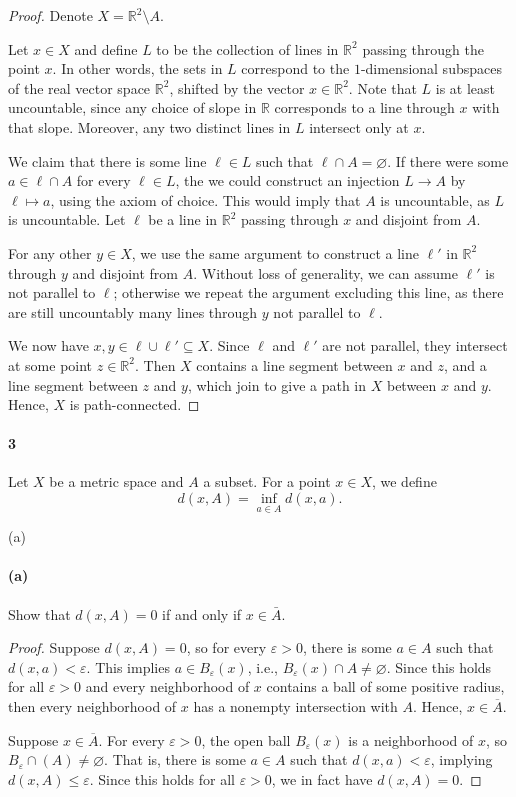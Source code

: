 \documentclass[12pt]{article}
\newlength{\myparskip}
\newenvironment{fullbox}{\begin{lrbox}{\savefullbox}\begin{minipage}{\dimexpr\textwidth-2\fboxsep\relax}\setlength{\parskip}{\myparskip}}{\end{minipage}\end{lrbox}\framebox[\textwidth]{\usebox{\savefullbox}}}
\newenvironment{pbox}[1][]{\begin{fullbox}\ifx#1\empty\else\paragraph{#1}\fi}{\end{fullbox}}
\newcommand{\R}{\mathbb{R}}
\newcommand{\eps}{\varepsilon}
\renewcommand{\emptyset}{\varnothing}
\newcommand{\<}{\langle}
\renewcommand{\>}{\rangle}
\newcommand{\clo}{\overline}
\begin{document}
\begin{proof}
    Denote $X = \R^2 \setminus A$.

    Let $x \in X$ and define $L$ to be the collection of lines in $\R^2$ passing through the point $x$. In other words, the sets in $L$ correspond to the $1$-dimensional subspaces of the real vector space $\R^2$, shifted by the vector $x \in \R^2$. Note that $L$ is at least uncountable, since any choice of slope in $\R$ corresponds to a line through $x$ with that slope. Moreover, any two distinct lines in $L$ intersect only at $x$. 

    We claim that there is some line $\ell \in L$ such that $\ell \cap A = \emptyset$. If there were some $a \in \ell \cap A$ for every $\ell \in L$, the we could construct an injection $L \to A$ by $\ell \mapsto a$, using the axiom of choice. This would imply that $A$ is uncountable, as $L$ is uncountable. Let $\ell$ be a line in $\R^2$ passing through $x$ and disjoint from $A$.

    For any other $y \in X$, we use the same argument to construct a line $\ell'$ in $\R^2$ through $y$ and disjoint from $A$. Without loss of generality, we can assume $\ell'$ is not parallel to $\ell$; otherwise we repeat the argument excluding this line, as there are still uncountably many lines through $y$ not parallel to $\ell$.

    We now have $x, y \in \ell \cup \ell' \subseteq X$. Since $\ell$ and $\ell'$ are not parallel, they intersect at some point $z \in \R^2$. Then $X$ contains a line segment between $x$ and $z$, and a line segment between $z$ and $y$, which join to give a path in $X$ between $x$ and $y$. Hence, $X$ is path-connected.


\end{proof}



\newpage
\begin{pbox}[3]
    Let $X$ be a metric space and $A$ a subset.  For a point $x \in X$, we
      define
      \[d(x,A)=\inf_{a \in A} d(x,a).\]
\end{pbox}

\begin{pbox}[(a)]
    Show that $d(x,A)=0$ if and only if $x \in \bar A$.
\end{pbox}

\begin{proof}
    Suppose $d(x, A) = 0$, so for every $\eps > 0$, there is some $a \in A$ such that $d(x, a) < \eps$. This implies $a \in B_\eps(x)$, i.e., $B_\eps(x) \cap A \ne \emptyset$. Since this holds for all $\eps > 0$ and every neighborhood of $x$ contains a ball of some positive radius, then every neighborhood of $x$ has a nonempty intersection with $A$. Hence, $x \in \clo{A}$.

    Suppose $x \in \clo{A}$. For every $\eps > 0$, the open ball $B_\eps(x)$ is a neighborhood of $x$, so $B_\eps \cap (A) \ne \emptyset$. That is, there is some $a \in A$ such that $d(x, a) < \eps$, implying $d(x, A) \leq \eps$. Since this holds for all $\eps > 0$, we in fact have $d(x, A) = 0$.

\end{proof}
\end{document}
